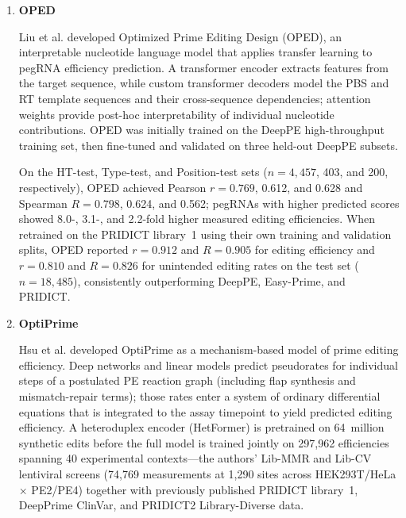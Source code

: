 \documentclass{article}
\begin{document}
\begin{enumerate}
    In grouped fivefold cross-validation on Library-Diverse, PRIDICT2.0 reached Spearman $R = 0.91$ / Pearson $r = 0.90$ in HEK293T and $R = 0.81$ / $r = 0.70$ in K562, outperforming PRIDICT~v1 on the same screens ($R = 0.83$ and $0.64$, respectively); gains were largest in K562 and for multi-base replacements and deletions.  Relative to PRIDICT~v1 ($R = 0.85$ / $r = 0.86$ on its 92{,}423-pegRNA Library~1)\cite{schwankgeraldPredictingPrimeEditing2023}, PRIDICT2.0 further generalized to longer edits and additional contexts. On endogenous and external sets it matched or exceeded PRIDICT~v1 (Mathis endogenous: HEK $R/r = 0.80/0.66$ vs.\ $0.81/0.69$, K562 $0.85/0.61$ vs.\ $0.69/0.48$; Anzalone HEK: $0.69/0.63$ vs.\ $0.47/0.47$).

    \item \textbf{OPED}
    
    Liu et al.\cite{liuDesignPrimeeditingGuide2023} developed Optimized Prime Editing Design (OPED), an interpretable nucleotide language model that applies transfer learning to pegRNA efficiency prediction. A transformer encoder extracts features from the target sequence, while custom transformer decoders model the PBS and RT template sequences and their cross-sequence dependencies; attention weights provide post-hoc interpretability of individual nucleotide contributions. OPED was initially trained on the DeepPE high-throughput training set, then fine-tuned and validated on three held-out DeepPE subsets. 

    On the HT-test, Type-test, and Position-test sets ($n = 4{,}457$, 403, and 200, respectively), OPED achieved Pearson $r = 0.769$, 0.612, and 0.628 and Spearman $R = 0.798$, 0.624, and 0.562; pegRNAs with higher predicted scores showed 8.0-, 3.1-, and 2.2-fold higher measured editing efficiencies. When retrained on the PRIDICT library~1 using their own training and validation splits, OPED reported $r = 0.912$ and $R = 0.905$ for editing efficiency and $r = 0.810$ and $R = 0.826$ for unintended editing rates on the test set ($n = 18{,}485$), consistently outperforming DeepPE, Easy-Prime, and PRIDICT. 

    \item \textbf{OptiPrime}

    Hsu et al.\cite{hsuMechanisticMachineLearning2026} developed OptiPrime as a mechanism-based model of prime editing efficiency. Deep networks and linear models predict pseudorates for individual steps of a postulated PE reaction graph (including flap synthesis and mismatch-repair terms); those rates enter a system of ordinary differential equations that is integrated to the assay timepoint to yield predicted editing efficiency. A heteroduplex encoder (HetFormer) is pretrained on 64~million synthetic edits before the full model is trained jointly on 297{,}962 efficiencies spanning 40 experimental contexts---the authors' Lib-MMR and Lib-CV lentiviral screens (74{,}769 measurements at 1{,}290 sites across HEK293T/HeLa $\times$ PE2/PE4) together with previously published PRIDICT library~1, DeepPrime ClinVar, and PRIDICT2 Library-Diverse data. 
    

\end{enumerate}
\end{document}

